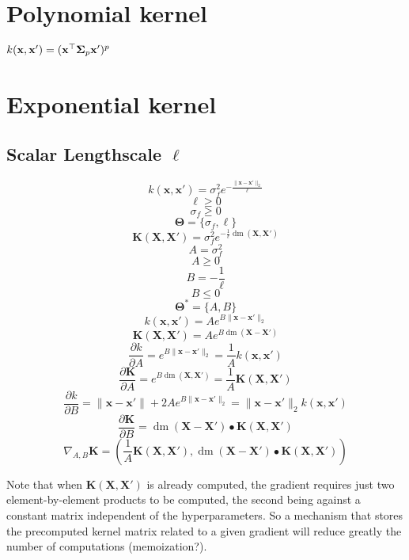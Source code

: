 \documentclass[a4paper,11pt]{article}
\newcommand\x{{\mathbf x}}
\newcommand\X{{\mathbf X}}
\newcommand\K{{\mathbf K}}
\DeclareMathOperator*{\dm}{dm}
\newcommand{\Ivec}[1]{\mbox{\boldmath $#1$}}
\begin{document}
\section{Polynomial kernel}
$k(\x,\x') = (\x^{\top} \Ivec{\Sigma}_p \x')^p$

\section{Exponential kernel}
\subsection{Scalar Lengthscale $\ell$}
$$k(\x,\x') = \sigma_f^2 e^{-\frac{\|\x-\x'\|_2}{\ell}}$$
$$\ell \ge 0$$
$$\sigma_f \ge 0$$
$$\mathbf{\Theta} = \{ \sigma_f, \ell \}$$
$$\K(\X,\X') = \sigma_f^2 e^{-\frac{1}{\ell}\dm(\X,\X')}$$
$$A = \sigma_f^2$$
$$A \ge 0$$
$$B = -\frac{1}{\ell}$$
$$B \le 0$$
$$\mathbf{\Theta}^* = \{ A, B \}$$
$$k(\x,\x') = A e^{B\|\x-\x'\|_2}$$
$$\K(\X,\X') = A e^{B \dm(\X-\X')}$$
$$\frac{\partial k}{\partial A} = e^{B\|\x-\x'\|_2} = \frac{1}{A}k(\x,\x')$$
$$\frac{\partial \K}{\partial A} = e^{B \dm(\X,\X')} = \frac{1}{A} \K(\X,\X')$$
$$\frac{\partial k}{\partial B} = \|\x-\x'\|+2 A e^{B\|\x-\x'\|_2} =
\|\x-\x'\|_2 k(\x,\x')$$
$$\frac{\partial \K}{\partial B} = \dm(\X-\X') \bullet \K(\X,\X')$$
$$\nabla_{A,B} \K = (\frac{1}{A} \K(\X,\X'), \dm(\X-\X') \bullet
\K(\X,\X'))$$

Note that when $\K(\X,\X')$ is already computed, the gradient requires
just two element-by-element products to be computed, the second being
against a constant matrix independent of the hyperparameters. So a
mechanism that stores the precomputed kernel matrix related to a given
gradient will reduce greatly the number of computations
(memoization?).
\end{document}
